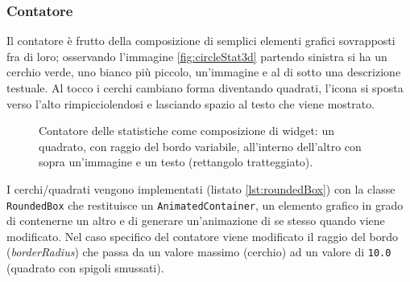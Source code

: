 \subsubsection{Contatore}
Il contatore è frutto della composizione di semplici elementi grafici sovrapposti fra di loro; osservando l'immagine \ref{fig:circleStat3d} partendo sinistra si ha un cerchio verde, uno bianco più piccolo, un'immagine e al di sotto una descrizione testuale. Al tocco i cerchi cambiano forma diventando quadrati, l'icona si sposta verso l'alto rimpicciolendosi e lasciando spazio al testo che viene mostrato.
\begin{figure}[h!]
  \centering
  \caption[Contatore come composizione di widget]{Contatore delle statistiche come composizione di widget: un quadrato, con raggio del bordo variabile, all'interno dell'altro con sopra un'immagine e un testo (rettangolo tratteggiato).}
  \label{fig:statCont3d}
\end{figure}

I cerchi/quadrati vengono implementati (listato \ref{lst:roundedBox}) con la classe \texttt{RoundedBox} che restituisce un \texttt{AnimatedContainer}, un elemento grafico in grado di contenerne un altro e di generare un'animazione di se stesso quando viene modificato. Nel caso specifico del contatore viene modificato il raggio del bordo (\textit{borderRadius}) che passa da un valore massimo (cerchio) ad un valore di \texttt{10.0} (quadrato con spigoli smussati).


